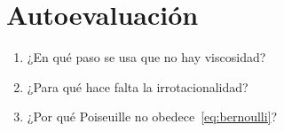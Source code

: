 \section{Autoevaluación}
\begin{enumerate}[leftmargin=1.4em]
\item ¿En qué paso se usa que no hay viscosidad?
\item ¿Para qué hace falta la irrotacionalidad?
\item ¿Por qué Poiseuille no obedece~\eqref{eq:bernoulli}?
\end{enumerate}
